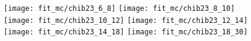 \begin{figure}[ht]    
      \centering
      \texttt{[image: fit\_mc/chib23\_6\_8]}
      \texttt{[image: fit\_mc/chib23\_8\_10]}
      \texttt{[image: fit\_mc/chib23\_10\_12]}
      \texttt{[image: fit\_mc/chib23\_12\_14]}
      \texttt{[image: fit\_mc/chib23\_14\_18]}
      \texttt{[image: fit\_mc/chib23\_18\_30]}
      \caption{\chibtwoThreeP}
      \label{fig:fit_mc_chibtwoThreeP}
\end{figure}

